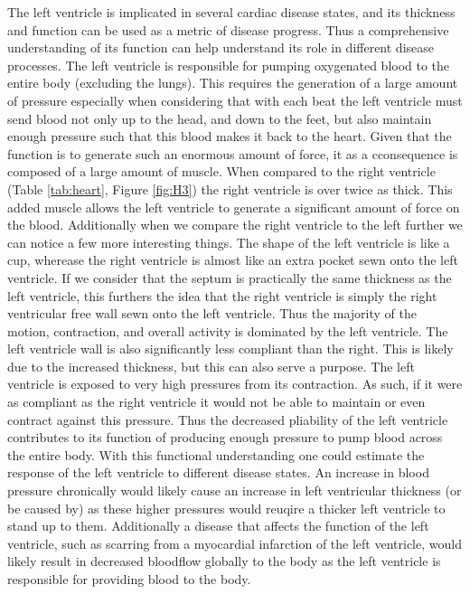 \documentclass[12pt]{article}
\begin{document}
The left ventricle is implicated in several cardiac disease states, and its thickness and function can be used as a metric of disease progress.\cite{Parfrey1996}\cite{Aurigemma2006} Thus a comprehensive understanding of its function can help understand its role in different disease processes. The left ventricle is responsible for pumping oxygenated blood to the entire body (excluding the lungs). This requires the generation of a large amount of pressure especially when considering that with each beat the left ventricle must send blood not only up to the head, and down to the feet, but also maintain enough pressure such that this blood makes it back to the heart. Given that the function is to generate such an enormous amount of force, it as a cconsequence is composed of a large amount of muscle. When compared to the right ventricle (Table \ref{tab:heart}, Figure \ref{fig:H3}) the right ventricle is over twice as thick. This added muscle allows the left ventricle to generate a significant amount of force on the blood. Additionally when we compare the right ventricle to the left further we can notice a few more interesting things. The shape of the left ventricle is like a cup, wherease the right ventricle is almost like an extra pocket sewn onto the left ventricle. If we consider that the septum is practically the same thickness as the left ventricle, this furthers the idea that the right ventricle is simply the right ventricular free wall sewn onto the left ventricle. Thus the majority of the motion, contraction, and overall activity is dominated by the left ventricle. The left ventricle wall is also significantly less compliant than the right. This is likely due to the increased thickness, but this can also serve a purpose. The left ventricle is exposed to very high pressures from its contraction. As such, if it were as compliant as the right ventricle it would not be able to maintain or even contract against this pressure. Thus the decreased pliability of the left ventricle contributes to its function of producing enough pressure to pump blood across the entire body. With this functional understanding one could estimate the response of the left ventricle to different disease states. An increase in blood pressure chronically would likely cause an increase in left ventricular thickness (or be caused by) as these higher pressures would reuqire a thicker left ventricle to stand up to them. Additionally a disease that affects the function of the left ventricle, such as scarring from a myocardial infarction of the left ventricle, would likely result in decreased bloodflow globally to the body as the left ventricle is responsible for providing blood to the body.
\end{document}
